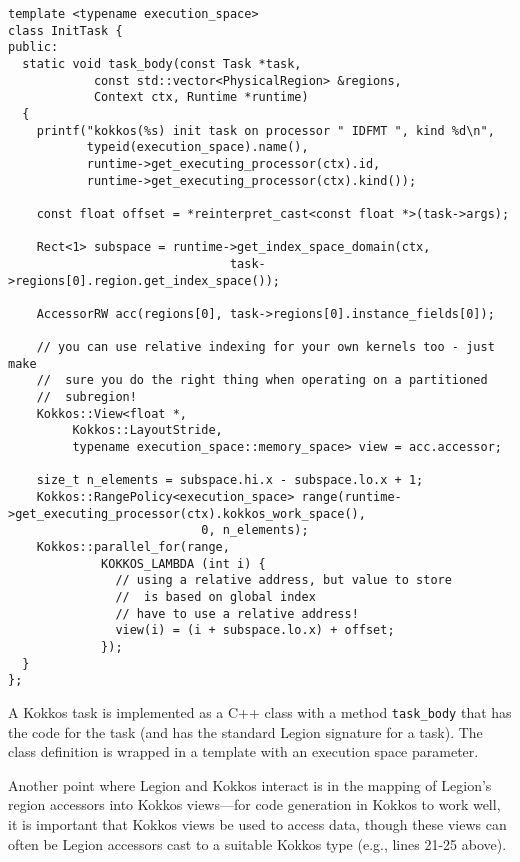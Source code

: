 \begin{lstlisting}
template <typename execution_space>
class InitTask {
public:
  static void task_body(const Task *task,
			const std::vector<PhysicalRegion> &regions,
			Context ctx, Runtime *runtime)
  {
    printf("kokkos(%s) init task on processor " IDFMT ", kind %d\n",
           typeid(execution_space).name(),
           runtime->get_executing_processor(ctx).id,
           runtime->get_executing_processor(ctx).kind());

    const float offset = *reinterpret_cast<const float *>(task->args);

    Rect<1> subspace = runtime->get_index_space_domain(ctx,
						       task->regions[0].region.get_index_space());

    AccessorRW acc(regions[0], task->regions[0].instance_fields[0]);

    // you can use relative indexing for your own kernels too - just make
    //  sure you do the right thing when operating on a partitioned
    //  subregion!
    Kokkos::View<float *,
		 Kokkos::LayoutStride,
		 typename execution_space::memory_space> view = acc.accessor;

    size_t n_elements = subspace.hi.x - subspace.lo.x + 1;
    Kokkos::RangePolicy<execution_space> range(runtime->get_executing_processor(ctx).kokkos_work_space(),
					       0, n_elements);
    Kokkos::parallel_for(range,
			 KOKKOS_LAMBDA (int i) {
			   // using a relative address, but value to store
			   //  is based on global index
			   // have to use a relative address!
			   view(i) = (i + subspace.lo.x) + offset;
			 });
  }
};
\end{lstlisting}

A Kokkos task is implemented as a C++ class with a method {\tt task\_body} that has the code for the task (and has the standard Legion signature for a task).  The class
definition is wrapped in a template with an execution space parameter.

Another point where Legion and Kokkos interact is in the mapping of Legion's region accessors into Kokkos views---for code generation in Kokkos to work well, it is important
that Kokkos views be used to access data, though these views can often be Legion accessors cast to a suitable Kokkos type (e.g., lines 21-25 above).

